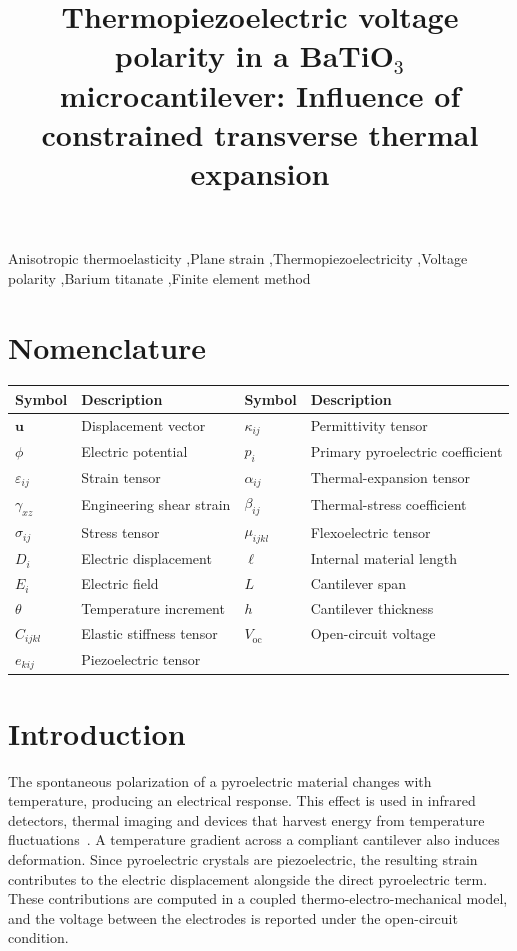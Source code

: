 \documentclass[a4paper,12pt]{elsarticle}
\begin{document}
\begin{frontmatter}
\title{Thermopiezoelectric voltage polarity in a BaTiO$_3$ microcantilever: Influence of constrained transverse thermal expansion}
\def\FINELManuscriptMode{}

\begin{keyword}
Anisotropic thermoelasticity \sep Plane strain \sep Thermopiezoelectricity \sep Voltage polarity \sep Barium titanate \sep Finite element method
\end{keyword}
\end{frontmatter}
\section*{Nomenclature}
\begingroup
\small
\setlength{\tabcolsep}{3pt}
\noindent\begin{tabularx}{\linewidth}{@{}l>{\raggedright\arraybackslash}Xl>{\raggedright\arraybackslash}X@{}}
\toprule
\textbf{Symbol} & \textbf{Description} & \textbf{Symbol} & \textbf{Description}\\
\midrule
$\bm u$ & Displacement vector & $\kappa_{ij}$ & Permittivity tensor\\
$\phi$ & Electric potential & $p_i$ & Primary pyroelectric coefficient\\
$\varepsilon_{ij}$ & Strain tensor & $\alpha_{ij}$ & Thermal-expansion tensor\\
$\gamma_{xz}$ & Engineering shear strain & $\beta_{ij}$ & Thermal-stress coefficient\\
$\sigma_{ij}$ & Stress tensor & $\mu_{ijkl}$ & Flexoelectric tensor\\
$D_i$ & Electric displacement & $\ell$ & Internal material length\\
$E_i$ & Electric field & $L$ & Cantilever span\\
$\theta$ & Temperature increment & $h$ & Cantilever thickness\\
$C_{ijkl}$ & Elastic stiffness tensor & $V_{\mathrm{oc}}$ & Open-circuit voltage\\
$e_{kij}$ & Piezoelectric tensor & &\\
\bottomrule
\end{tabularx}
\endgroup

\section{Introduction}

The spontaneous polarization of a pyroelectric material changes with
temperature, producing an electrical response. This effect is used in
infrared detectors, thermal imaging and devices that harvest energy
from temperature fluctuations~\cite{Lang2005Pyro,Whatmore1986,Lubomirsky2012}.
A temperature gradient across a compliant cantilever also induces
deformation. Since pyroelectric crystals are piezoelectric, the resulting
strain contributes to the electric displacement alongside the direct
pyroelectric term. These contributions are computed in a coupled
thermo-electro-mechanical model, and the voltage between the electrodes
is reported under the open-circuit condition.
\end{document}
